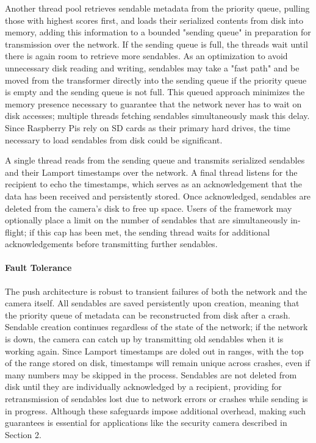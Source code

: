 Another thread pool retrieves sendable metadata from the priority queue, pulling
those with highest scores first, and loads their serialized contents from disk into
memory, adding this information to a bounded "sending queue" in preparation for transmission
over the network.  If the sending queue is full, the threads wait until there is again
room to retrieve more sendables.  As an optimization to avoid unnecessary disk
reading and writing, sendables may take a "fast path" and be moved from the transformer
directly into the sending queue if the priority queue is empty and the sending queue is not full.
This queued approach minimizes the memory presence necessary to guarantee that
the network never has to wait on disk accesses;
multiple threads fetching sendables simultaneously mask this delay.  Since Raspberry Pis
rely on SD cards as their primary hard drives, the time necessary to load sendables from
disk could be significant.

A single thread reads from the sending queue and transmits serialized sendables and their
Lamport timestamps over the network.  A final thread listens for the recipient to
echo the timestamps, which serves as an acknowledgement that the data has
been received and persistently stored.  Once acknowledged, sendables are deleted
from the camera's disk to free up space.  Users of the framework may optionally
place a limit on the number of sendables that are simultaneously in-flight; if this
cap has been met, the sending thread waits for additional acknowledgements
before transmitting further sendables.

\paragraph{Fault Tolerance}

The push architecture is robust to transient failures of both the network and the
camera itself.  All sendables are saved persistently upon creation, meaning that
the priority queue of metadata can be reconstructed from disk after a crash.
Sendable creation continues regardless of the state of the network; if the network
is down, the camera can catch up by transmitting old sendables when it is working again.
Since Lamport timestamps are doled out in ranges, with the top of the range stored
on disk, timestamps will remain unique across crashes, even if many numbers may be
skipped in the process.  Sendables are not deleted from disk until they are individually
acknowledged by a recipient, providing for retransmission of sendables lost due to
network errors or crashes while sending is in progress.  Although these safeguards
impose additional overhead, making such guarantees is essential for applications like
the security camera described in Section 2.

